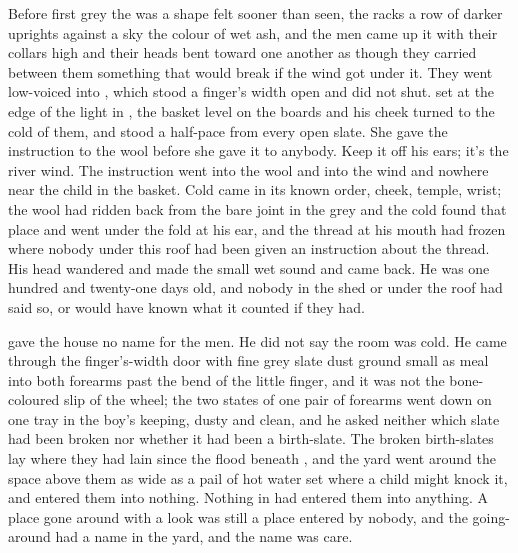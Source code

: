 
Before first grey the  was a shape felt sooner than seen, the racks a row of darker uprights against a sky the colour of wet ash, and the men came up it with their collars high and their heads bent toward one another as though they carried between them something that would break if the wind got under it. They went low-voiced into , which stood a finger's width open and did not shut.  set  at the edge of the light in , the basket level on the boards and his cheek turned to the cold of them, and stood a half-pace from every open slate. She gave the instruction to the wool before she gave it to anybody. Keep it off his ears; it's the river wind. The instruction went into the wool and into the wind and nowhere near the child in the basket. Cold came in its known order, cheek, temple, wrist; the wool had ridden back from the bare joint in the grey and the cold found that place and went under the fold at his ear, and the thread at his mouth had frozen where nobody under this roof had been given an instruction about the thread. His head wandered and made the small wet sound and came back. He was one hundred and twenty-one days old, and nobody in the shed or under the roof had said so, or would have known what it counted if they had.

 gave the house no name for the men. He did not say the room was cold. He came through the finger's-width door with fine grey slate dust ground small as meal into both forearms past the bend of the little finger, and it was not the bone-coloured slip of the wheel; the two states of one pair of forearms went down on one tray in the boy's keeping, dusty and clean, and he asked neither which slate had been broken nor whether it had been a birth-slate. The broken birth-slates lay where they had lain since the flood beneath , and the yard went around the space above them as wide as a pail of hot water set where a child might knock it, and entered them into nothing. Nothing in  had entered them into anything. A place gone around with a look was still a place entered by nobody, and the going-around had a name in the yard, and the name was care.

